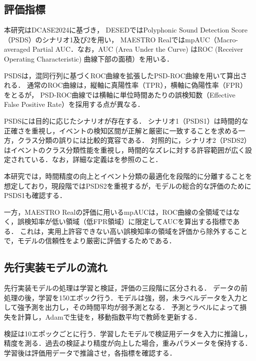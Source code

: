 \documentclass[main]{subfiles}
\begin{document}
\subsection{評価指標}
    \label{評価指標}
本研究はDCASE2024に基づき，
DESEDではPolyphonic Sound Detection Score（PSDS）\cite{bilen2020framework}のシナリオ1及び2を用い，
MAESTRO RealではmpAUC（Macro-averaged Partial AUC．なお，AUC (Area Under the Curve) はROC (Receiver Operating Characteristic) 曲線下部の面積）を用いる．\par

PSDSは，混同行列に基づくROC曲線を拡張したPSD-ROC曲線を用いて算出される．
通常のROC曲線は，縦軸に真陽性率（TPR），横軸に偽陽性率（FPR）をとるが，
PSD-ROC曲線では横軸に単位時間あたりの誤検知数（Effective False Positive Rate）を採用する点が異なる．

PSDSには目的に応じたシナリオが存在する．
シナリオ1（PSDS1）は時間的な正確さを重視し，イベントの検知区間が正解と厳密に一致することを求める一方，クラス分類の誤りには比較的寛容である．
対照的に，シナリオ2（PSDS2）はイベントのクラス分類性能を重視し，時間的なズレに対する許容範囲が広く設定されている．なお，詳細な定義は\cite{bilen2020framework}を参照のこと．

本研究では，時間精度の向上とイベント分類の最適化を段階的に分離することを想定しており，現段階ではPSDS2を重視するが，モデルの総合的な評価のためにPSDS1も確認する．\par

一方，MAESTRO Realの評価に用いるmpAUCは，ROC曲線の全領域ではなく，誤検知率が低い領域（低FPR領域）に限定してAUCを算出する指標である．
これは，実用上許容できない高い誤検知率の領域を評価から除外することで，モデルの信頼性をより厳密に評価するためである．

\subsection{先行実装モデルの流れ}
先行実装モデルの処理は学習と検証，評価の三段階に区分される．
データの前処理の後，学習を150エポック行う．モデルは強，弱，未ラベルデータを入力として強予測を出力し，その時間平均が弱予測となる．
予測とラベルによって損失を計算し，Adam\cite{kingma2014adam}で生徒を，移動指数平均で教師を更新する．\par
検証は10エポックごとに行う．学習したモデルで検証用データを入力に推論し，精度を測る．過去の検証より精度が向上した場合，重みパラメータを保持する．
学習後は評価用データで推論させ，各指標を確認する．\par
\end{document}
